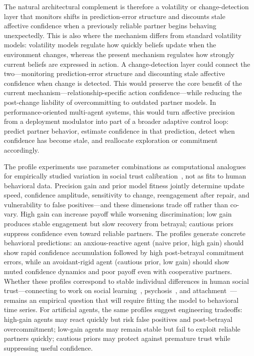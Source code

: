 The natural architectural complement is therefore a volatility or change-detection layer that monitors shifts in prediction-error structure and discounts stale affective confidence when a previously reliable partner begins behaving unexpectedly. This is also where the mechanism differs from standard volatility models: volatility models regulate how quickly beliefs update when the environment changes, whereas the present mechanism regulates how strongly current beliefs are expressed in action. A change-detection layer could connect the two---monitoring prediction-error structure and discounting stale affective confidence when change is detected. This would preserve the core benefit of the current mechanism---relationship-specific action confidence---while reducing the post-change liability of overcommitting to outdated partner models. In performance-oriented multi-agent systems, this would turn affective precision from a deployment modulator into part of a broader adaptive control loop: predict partner behavior, estimate confidence in that prediction, detect when confidence has become stale, and reallocate exploration or commitment accordingly.

The profile experiments use parameter combinations as computational analogues for empirically studied variation in social trust calibration~\cite{Behrens2008SocialLearning,Adams2013ComputationalPsychosis,Cittern2018AttachmentActiveInference}, not as fits to human behavioral data. Precision gain and prior model fitness jointly determine update speed, confidence amplitude, sensitivity to change, reengagement after repair, and vulnerability to false positives---and these dimensions trade off rather than co-vary. High gain can increase payoff while worsening discrimination; low gain produces stable engagement but slow recovery from betrayal; cautious priors suppress confidence even toward reliable partners. The profiles generate concrete behavioral predictions: an anxious-reactive agent (naive prior, high gain) should show rapid confidence accumulation followed by high post-betrayal commitment errors, while an avoidant-rigid agent (cautious prior, low gain) should show muted confidence dynamics and poor payoff even with cooperative partners. Whether these profiles correspond to stable individual differences in human social trust---connecting to work on social learning~\cite{Behrens2008SocialLearning}, psychosis~\cite{Adams2013ComputationalPsychosis}, and attachment~\cite{Cittern2018AttachmentActiveInference}---remains an empirical question that will require fitting the model to behavioral time series. For artificial agents, the same profiles suggest engineering tradeoffs: high-gain agents may react quickly but risk false positives and post-betrayal overcommitment; low-gain agents may remain stable but fail to exploit reliable partners quickly; cautious priors may protect against premature trust while suppressing useful confidence.

